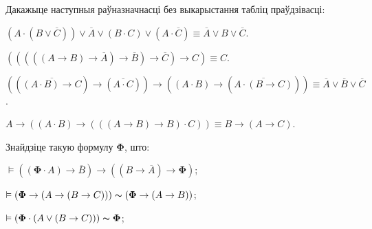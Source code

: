 




\begin{problemList}

\item
Дакажыце наступныя раўназначнасці без выкарыстання табліц праўдзівасці: \\

\begin{belarusianEnumerate}

\item $(A \cdot (B \vee \overline{C})) \vee \overline{A} \vee (B \cdot C) \vee
(A \cdot \overline{C}) \equiv \overline{A} \vee B \vee \overline{C}$.

\item $(((((A \to B) \to \overline{A}) \to \overline{B}) \to \overline{C}) \to C)
\equiv C$.

\item $((\overline{(A \cdot B) \to C}) \to (\overline{A \cdot C})) \to ((A \cdot B) \to
(\overline{A \cdot (B \to C)})) \equiv \overline{A} \vee \overline{B} \vee \overline{C}$.

\item $A \to ((A \cdot B) \to (((A \to B) \to B) \cdot C)) \equiv B \to (A \to C)$.

\end{belarusianEnumerate}

\smallskip

\item
Знайдзіце такую формулу $\boldsymbol{\Phi}$, што: \\

\begin{belarusianEnumerate}

\item $\vDash ((\boldsymbol{\Phi} \cdot A) \to \overline{B}) \to
((B \to \overline{A}) \to \boldsymbol{\Phi})$;

\item $\vDash (\boldsymbol{\Phi} \to (A \to (B \to C))) \thicksim (\boldsymbol{\Phi} \to (A \to B))$;

\item $\vDash (\boldsymbol{\Phi} \cdot (A \vee (B \to C))) \thicksim \boldsymbol{\Phi}$;


\end{belarusianEnumerate}
\end{problemList}
